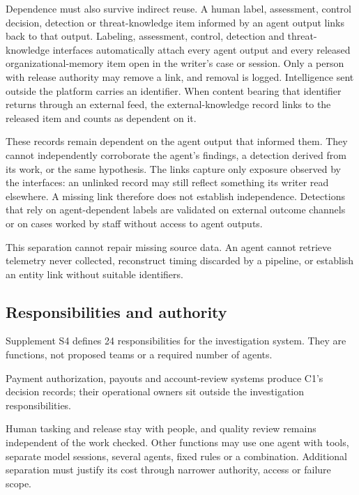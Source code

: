 \documentclass[acmlarge,nonacm]{acmart}
\begin{document}
Dependence must also survive indirect reuse. A human label, assessment,
control decision, detection or threat-knowledge item informed by an
agent output links back to that output. Labeling, assessment, control,
detection and threat-knowledge interfaces automatically attach every
agent output and every released organizational-memory item open in the
writer's case or session. Only a person with release authority may
remove a link, and removal is logged. Intelligence sent outside the
platform carries an identifier. When content bearing that identifier
returns through an external feed, the external-knowledge record links to
the released item and counts as dependent on it.

These records remain dependent on the agent output that informed them.
They cannot independently corroborate the agent's findings, a detection
derived from its work, or the same hypothesis. The links capture only
exposure observed by the interfaces: an unlinked record may still
reflect something its writer read elsewhere. A missing link therefore
does not establish independence. Detections that rely on agent-dependent
labels are validated on external outcome channels or on cases worked by
staff without access to agent outputs.

This separation cannot repair missing source data. An agent cannot
retrieve telemetry never collected, reconstruct timing discarded by a
pipeline, or establish an entity link without suitable identifiers.

\hypertarget{responsibilities-and-authority}{%
\subsection{Responsibilities and
authority}\label{responsibilities-and-authority}}

Supplement S4 defines 24 responsibilities for the investigation system.
They are functions, not proposed teams or a required number of agents.

Payment authorization, payouts and account-review systems produce C1's
decision records; their operational owners sit outside the investigation
responsibilities.

Human tasking and release stay with people, and quality review remains
independent of the work checked. Other functions may use one agent with
tools, separate model sessions, several agents, fixed rules or a
combination. Additional separation must justify its cost through
narrower authority, access or failure scope.
\end{document}
